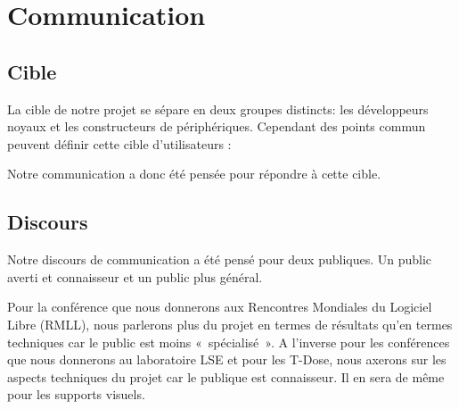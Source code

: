 \documentclass[francais]{rtxreport}
\begin{document}
\chapter{Communication}




\section{Cible}

La cible de notre projet se sépare en deux groupes distincts: les développeurs
noyaux et les constructeurs de périphériques. Cependant des points commun
peuvent définir cette cible d'utilisateurs :




Notre communication a donc été pensée pour répondre à cette cible.

\section{Discours}

Notre discours de communication a été pensé pour deux publiques. Un public
averti et connaisseur et un public plus général.

Pour la conférence que nous donnerons aux Rencontres Mondiales du Logiciel
Libre (RMLL), nous parlerons plus du projet en termes de résultats qu'en termes
techniques car le public est moins «~spécialisé~». A l'inverse pour les
conférences que nous donnerons au laboratoire LSE et pour les T-Dose, nous
axerons sur les aspects techniques du projet car le publique est connaisseur.
Il en sera de même pour les supports visuels.
\end{document}
